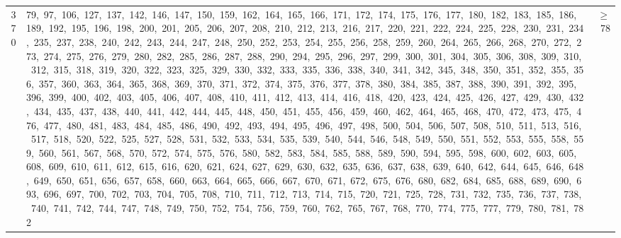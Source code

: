 \begin{longtable}{c|p{}|r}
370 & 79,\ 97,\ 106,\ 127,\ 137,\ 142,\ 146,\ 147,\ 150,\ 159,\ 162,\ 164,\ 165,\ 166,\ 171,\ 172,\ 174,\ 175,\ 176,\ 177,\ 180,\ 182,\ 183,\ 185,\ 186,\ 189,\ 192,\ 195,\ 196,\ 198,\ 200,\ 201,\ 205,\ 206,\ 207,\ 208,\ 210,\ 212,\ 213,\ 216,\ 217,\ 220,\ 221,\ 222,\ 224,\ 225,\ 228,\ 230,\ 231,\ 234,\ 235,\ 237,\ 238,\ 240,\ 242,\ 243,\ 244,\ 247,\ 248,\ 250,\ 252,\ 253,\ 254,\ 255,\ 256,\ 258,\ 259,\ 260,\ 264,\ 265,\ 266,\ 268,\ 270,\ 272,\ 273,\ 274,\ 275,\ 276,\ 279,\ 280,\ 282,\ 285,\ 286,\ 287,\ 288,\ 290,\ 294,\ 295,\ 296,\ 297,\ 299,\ 300,\ 301,\ 304,\ 305,\ 306,\ 308,\ 309,\ 310,\ 312,\ 315,\ 318,\ 319,\ 320,\ 322,\ 323,\ 325,\ 329,\ 330,\ 332,\ 333,\ 335,\ 336,\ 338,\ 340,\ 341,\ 342,\ 345,\ 348,\ 350,\ 351,\ 352,\ 355,\ 356,\ 357,\ 360,\ 363,\ 364,\ 365,\ 368,\ 369,\ 370,\ 371,\ 372,\ 374,\ 375,\ 376,\ 377,\ 378,\ 380,\ 384,\ 385,\ 387,\ 388,\ 390,\ 391,\ 392,\ 395,\ 396,\ 399,\ 400,\ 402,\ 403,\ 405,\ 406,\ 407,\ 408,\ 410,\ 411,\ 412,\ 413,\ 414,\ 416,\ 418,\ 420,\ 423,\ 424,\ 425,\ 426,\ 427,\ 429,\ 430,\ 432,\ 434,\ 435,\ 437,\ 438,\ 440,\ 441,\ 442,\ 444,\ 445,\ 448,\ 450,\ 451,\ 455,\ 456,\ 459,\ 460,\ 462,\ 464,\ 465,\ 468,\ 470,\ 472,\ 473,\ 475,\ 476,\ 477,\ 480,\ 481,\ 483,\ 484,\ 485,\ 486,\ 490,\ 492,\ 493,\ 494,\ 495,\ 496,\ 497,\ 498,\ 500,\ 504,\ 506,\ 507,\ 508,\ 510,\ 511,\ 513,\ 516,\ 517,\ 518,\ 520,\ 522,\ 525,\ 527,\ 528,\ 531,\ 532,\ 533,\ 534,\ 535,\ 539,\ 540,\ 544,\ 546,\ 548,\ 549,\ 550,\ 551,\ 552,\ 553,\ 555,\ 558,\ 559,\ 560,\ 561,\ 567,\ 568,\ 570,\ 572,\ 574,\ 575,\ 576,\ 580,\ 582,\ 583,\ 584,\ 585,\ 588,\ 589,\ 590,\ 594,\ 595,\ 598,\ 600,\ 602,\ 603,\ 605,\ 608,\ 609,\ 610,\ 611,\ 612,\ 615,\ 616,\ 620,\ 621,\ 624,\ 627,\ 629,\ 630,\ 632,\ 635,\ 636,\ 637,\ 638,\ 639,\ 640,\ 642,\ 644,\ 645,\ 646,\ 648,\ 649,\ 650,\ 651,\ 656,\ 657,\ 658,\ 660,\ 663,\ 664,\ 665,\ 666,\ 667,\ 670,\ 671,\ 672,\ 675,\ 676,\ 680,\ 682,\ 684,\ 685,\ 688,\ 689,\ 690,\ 693,\ 696,\ 697,\ 700,\ 702,\ 703,\ 704,\ 705,\ 708,\ 710,\ 711,\ 712,\ 713,\ 714,\ 715,\ 720,\ 721,\ 725,\ 728,\ 731,\ 732,\ 735,\ 736,\ 737,\ 738,\ 740,\ 741,\ 742,\ 744,\ 747,\ 748,\ 749,\ 750,\ 752,\ 754,\ 756,\ 759,\ 760,\ 762,\ 765,\ 767,\ 768,\ 770,\ 774,\ 775,\ 777,\ 779,\ 780,\ 781,\ 782 & $\ge$ 78 \\

\end{longtable}
